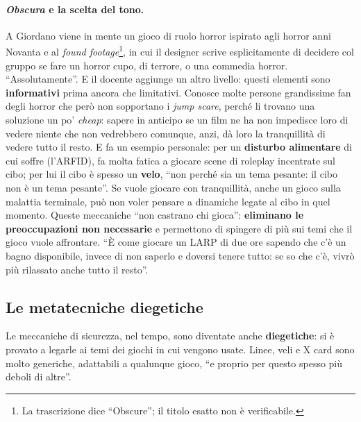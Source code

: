 \paragraph{\emph{Obscura} e la scelta del tono.} A Giordano viene in mente un gioco di
ruolo horror ispirato agli horror anni Novanta e al \emph{found
footage}\footnote{La trascrizione dice ``Obscure''; il titolo esatto non è
verificabile.}, in cui il designer scrive esplicitamente di decidere col gruppo se
fare un horror cupo, di terrore, o una commedia horror. ``Assolutamente''. E il
docente aggiunge un altro livello: questi elementi sono \textbf{informativi} prima
ancora che limitativi. Conosce molte persone grandissime fan degli horror che però
non sopportano i \emph{jump scare}, perché li trovano una soluzione un po'
\emph{cheap}: sapere in anticipo se un film ne ha non impedisce loro di vedere
niente che non vedrebbero comunque, anzi, dà loro la tranquillità di vedere tutto il
resto. E fa un esempio personale: per un \textbf{disturbo alimentare} di cui soffre
(l'ARFID), fa molta fatica a giocare scene di roleplay incentrate sul cibo; per lui il
cibo è spesso un \textbf{velo}, ``non perché sia un tema pesante: il cibo non è un tema
pesante''. Se vuole giocare con tranquillità, anche un gioco sulla malattia terminale,
può non voler pensare a dinamiche legate al cibo in quel momento. Queste meccaniche
``non castrano chi gioca'': \textbf{eliminano le preoccupazioni non necessarie} e
permettono di spingere di più sui temi che il gioco vuole affrontare. ``È come giocare
un LARP di due ore sapendo che c'è un bagno disponibile, invece di non saperlo e
doversi tenere tutto: se so che c'è, vivrò più rilassato anche tutto il resto''.

\subsection{Le metatecniche diegetiche}

Le meccaniche di sicurezza, nel tempo, sono diventate anche \textbf{diegetiche}: si è
provato a legarle ai temi dei giochi in cui vengono usate. Linee, veli e X card sono
molto generiche, adattabili a qualunque gioco, ``e proprio per questo spesso più deboli
di altre''.

